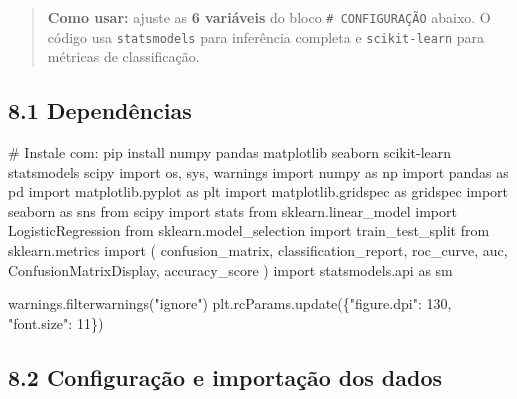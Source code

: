 \documentclass[
  letterpaper,
  DIV=11,
  numbers=noendperiod]{scrartcl}
\newenvironment{Shaded}{\begin{snugshade}}{\end{snugshade}}
\newcommand{\CommentTok}[1]{\textcolor[rgb]{0.37,0.37,0.37}{#1}}
\newcommand{\DecValTok}[1]{\textcolor[rgb]{0.68,0.00,0.00}{#1}}
\newcommand{\ImportTok}[1]{\textcolor[rgb]{0.00,0.46,0.62}{#1}}
\newcommand{\NormalTok}[1]{\textcolor[rgb]{0.00,0.23,0.31}{#1}}
\newcommand{\StringTok}[1]{\textcolor[rgb]{0.13,0.47,0.30}{#1}}
\begin{document}
\begin{quote}
\textbf{Como usar:} ajuste as \textbf{6 variáveis} do bloco
\texttt{\#\ CONFIGURAÇÃO} abaixo. O código usa \texttt{statsmodels} para
inferência completa e \texttt{scikit-learn} para métricas de
classificação.
\end{quote}

\subsection{8.1 Dependências}\label{dependuxeancias}

\begin{Shaded}
\begin{Highlighting}[]
\CommentTok{\# Instale com: pip install numpy pandas matplotlib seaborn scikit{-}learn statsmodels scipy}
\ImportTok{import}\NormalTok{ os, sys, warnings}
\ImportTok{import}\NormalTok{ numpy             }\ImportTok{as}\NormalTok{ np}
\ImportTok{import}\NormalTok{ pandas            }\ImportTok{as}\NormalTok{ pd}
\ImportTok{import}\NormalTok{ matplotlib.pyplot }\ImportTok{as}\NormalTok{ plt}
\ImportTok{import}\NormalTok{ matplotlib.gridspec }\ImportTok{as}\NormalTok{ gridspec}
\ImportTok{import}\NormalTok{ seaborn           }\ImportTok{as}\NormalTok{ sns}
\ImportTok{from}\NormalTok{ scipy  }\ImportTok{import}\NormalTok{ stats}
\ImportTok{from}\NormalTok{ sklearn.linear\_model    }\ImportTok{import}\NormalTok{ LogisticRegression}
\ImportTok{from}\NormalTok{ sklearn.model\_selection }\ImportTok{import}\NormalTok{ train\_test\_split}
\ImportTok{from}\NormalTok{ sklearn.metrics         }\ImportTok{import}\NormalTok{ (}
\NormalTok{    confusion\_matrix, classification\_report,}
\NormalTok{    roc\_curve, auc, ConfusionMatrixDisplay, accuracy\_score}
\NormalTok{)}
\ImportTok{import}\NormalTok{ statsmodels.api }\ImportTok{as}\NormalTok{ sm}

\NormalTok{warnings.filterwarnings(}\StringTok{"ignore"}\NormalTok{)}
\NormalTok{plt.rcParams.update(\{}\StringTok{"figure.dpi"}\NormalTok{: }\DecValTok{130}\NormalTok{, }\StringTok{"font.size"}\NormalTok{: }\DecValTok{11}\NormalTok{\})}
\end{Highlighting}
\end{Shaded}

\subsection{8.2 Configuração e importação dos
dados}\label{configurauxe7uxe3o-e-importauxe7uxe3o-dos-dados-1}
\end{document}
